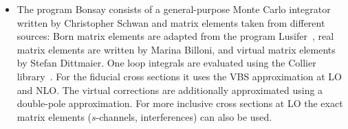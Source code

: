 \documentclass[twocolumn,epjc3]{svjour3} %
\begin{document}
    \begin{itemize}

    \item The program {\sc Bonsay} consists of a general-purpose Monte Carlo integrator written by Christopher Schwan and matrix elements taken from different sources:
    Born matrix elements are adapted from the program {\sc Lusifer}~\cite{Dittmaier:2002ap}, real matrix elements are written by Marina Billoni, and virtual matrix elements by Stefan Dittmaier.
    One loop integrals are evaluated using the {\sc Collier} library~\cite{Denner:2014gla,Denner:2016kdg}.
    For the fiducial cross sections it uses the VBS approximation at LO and NLO.
    The virtual corrections are additionally approximated using a double-pole approximation.
    For more inclusive cross sections at LO the exact matrix elements ($s$-channels, interferences) can also be used.


\end{itemize}
\end{document}
